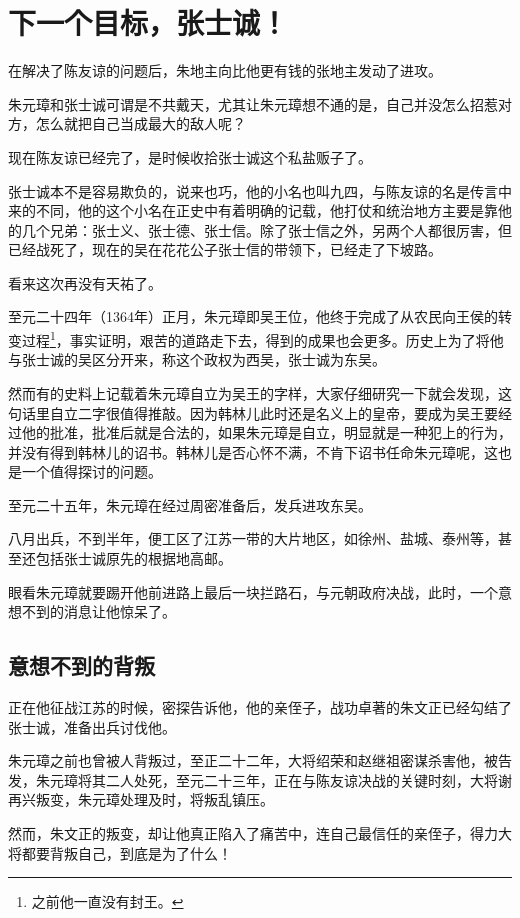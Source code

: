 \section{下一个目标，张士诚！}
\ifnum{}
	\begin{multicols}{\theparacolNo}
		\fi
		在解决了陈友谅的问题后，朱地主向比他更有钱的张地主发动了进攻。

		朱元璋和张士诚可谓是不共戴天，尤其让朱元璋想不通的是，自己并没怎么招惹对方，怎么就把自己当成最大的敌人呢？

		现在陈友谅已经完了，是时候收拾张士诚这个私盐贩子了。

		张士诚本不是容易欺负的，说来也巧，他的小名也叫九四，与陈友谅的名是传言中来的不同，他的这个小名在正史中有着明确的记载，他打仗和统治地方主要是靠他的几个兄弟：张士义、张士德、张士信。除了张士信之外，另两个人都很厉害，但已经战死了，现在的吴在花花公子张士信的带领下，已经走了下坡路。

		看来这次再没有天祐了。

		至元二十四年（1364年）正月，朱元璋即吴王位，他终于完成了从农民向王侯的转变过程\footnote{之前他一直没有封王。}，事实证明，艰苦的道路走下去，得到的成果也会更多。历史上为了将他与张士诚的吴区分开来，称这个政权为西吴，张士诚为东吴。

		然而有的史料上记载着朱元璋自立为吴王的字样，大家仔细研究一下就会发现，这句话里自立二字很值得推敲。因为韩林儿此时还是名义上的皇帝，要成为吴王要经过他的批准，批准后就是合法的，如果朱元璋是自立，明显就是一种犯上的行为，并没有得到韩林儿的诏书。韩林儿是否心怀不满，不肯下诏书任命朱元璋呢，这也是一个值得探讨的问题。

		至元二十五年，朱元璋在经过周密准备后，发兵进攻东吴。

		八月出兵，不到半年，便工区了江苏一带的大片地区，如徐州、盐城、泰州等，甚至还包括张士诚原先的根据地高邮。

		眼看朱元璋就要踢开他前进路上最后一块拦路石，与元朝政府决战，此时，一个意想不到的消息让他惊呆了。

		\subsection{意想不到的背叛}
		正在他征战江苏的时候，密探告诉他，他的亲侄子，战功卓著的朱文正已经勾结了张士诚，准备出兵讨伐他。

		朱元璋之前也曾被人背叛过，至正二十二年，大将绍荣和赵继祖密谋杀害他，被告发，朱元璋将其二人处死，至元二十三年，正在与陈友谅决战的关键时刻，大将谢再兴叛变，朱元璋处理及时，将叛乱镇压。

		然而，朱文正的叛变，却让他真正陷入了痛苦中，连自己最信任的亲侄子，得力大将都要背叛自己，到底是为了什么！


\end{multicols}
